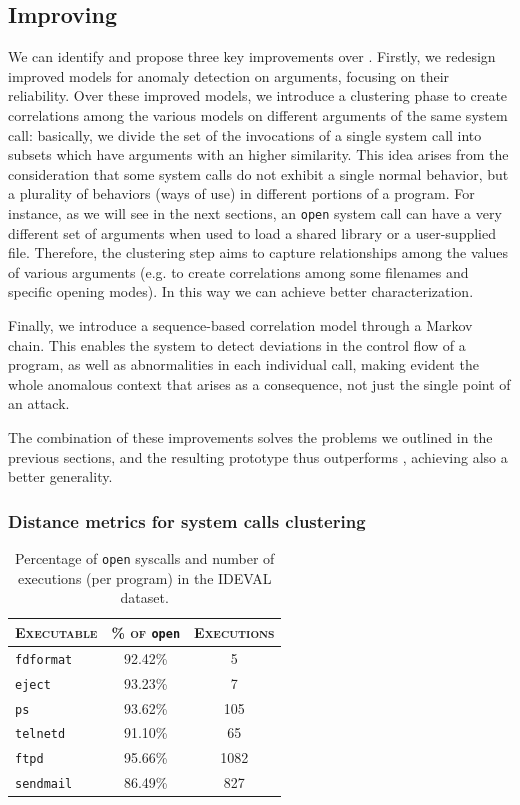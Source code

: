 \subsection{Improving \SyscallAnomaly}
\label{host:syscall:our-proposal}
We can identify and propose three key improvements over
\SyscallAnomaly. Firstly, we redesign improved models for anomaly
detection on arguments, focusing on their reliability. Over these
improved models, we introduce a clustering phase to create
correlations among the various models on different arguments of the
same system call: basically, we divide the set of the invocations of a
single system call into subsets which have arguments with an higher
similarity. This idea arises from the consideration that some system
calls do not exhibit a single normal behavior, but a plurality of
behaviors (ways of use) in different portions of a program. For
instance, as we will see in the next sections, an \texttt{open}
system call can have a very different set of arguments when used to load a
shared library or a user-supplied file. Therefore, the clustering step
aims to capture relationships among the values of various arguments
(e.g. to create correlations among some filenames and specific opening
modes). In this way we can achieve better characterization.

Finally, we introduce a sequence-based correlation model through a
Markov chain. This enables the system to detect deviations in the
control flow of a program, as well as abnormalities in each individual
call, making evident the whole anomalous context that arises as a
consequence, not just the single point of an attack.

The combination of these improvements solves the problems we outlined
in the previous sections, and the resulting prototype thus outperforms
\SyscallAnomaly, achieving also a better generality.

\subsubsection{Distance metrics for system calls clustering}
\label{host:syscall:clust-syst-calls}

\begin{table}[tb]
  \centering
  \begin{tabular}{lcc}
    \toprule
    \textsc{Executable} & \textsc{\% of} \texttt{open} & \textsc{Executions}\\
    \midrule
    \texttt{fdformat} & 92.42\% & 5\\
    \texttt{eject} & 93.23\% & 7\\
    \texttt{ps} & 93.62\% & 105\\
    \texttt{telnetd} & 91.10\% & 65\\
    \texttt{ftpd} & 95.66\% & 1082\\
    \texttt{sendmail} & 86.49\% & 827\\
    \bottomrule
  \end{tabular}
  \caption{Percentage of \texttt{open} syscalls and number of executions (per program) in the \ac{IDEVAL} dataset.}
  \label{tab:open-perc}
\end{table}

